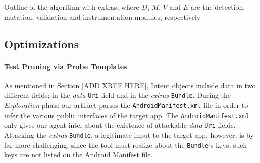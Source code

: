 \begin{algorithm}[t]
\DontPrintSemicolon
{}
\;
\;
\caption{\label{Al:maalg}Outline of the algorithm with extras, where $D$, $M$, $V$ and $E$ are the detection, mutation, validation and instrumentation modules, respectively}
\end{algorithm}


\subsection{Optimizations}

\paragraph{Test Pruning via Probe Templates}


%
As mentioned in Section {[}ADD XREF HERE{]}, Intent objects include
data in two different fields; in the \textit{data} \texttt{Uri} field
and in the \textit{extras} \texttt{Bundle}. During the \textit{Exploration
}phase our artifact parses the \texttt{AndroidManifest.xml} file in
order to infer the various public interfaces of the target app. The
\texttt{AndroidManifest.xml} only gives our agent intel about the
existence of attackable\textit{ data} \texttt{Uri} fields. Attacking
the \textit{extras} \texttt{Bundle}, a legitimate input to the target
app, however, is by far more challenging, since the tool must realize
about the \texttt{Bundle}'s keys; such keys are not listed on the
Android Manifest file. 


